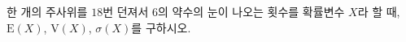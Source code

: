 한 개의 주사위를 $18$번 던져서 $6$의 약수의 눈이 나오는 횟수를 확률변수 $X$라 할 때, $\mathrm{E}(X)$, $\mathrm{V}(X)$, $\sigma(X)$를 구하시오.
